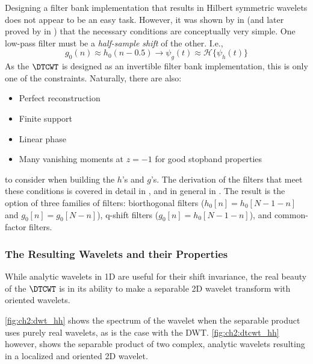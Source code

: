   Designing a filter bank implementation that results in Hilbert symmetric
  wavelets does not appear to be an easy task. However, it was shown
  by \citeauthor{kingsbury_image_1999} in \cite{kingsbury_image_1999} (and later proved by
  \citeauthor{selesnick_hilbert_2001} in \cite{selesnick_hilbert_2001}) that the
  necessary conditions are conceptually very simple. One low-pass filter must be
  a \emph{half-sample shift} of the other. I.e.,\ 
  \begin{equation}
    g_0(n) \approx h_0(n-0.5) \rightarrow \psi_g(t) \approx
    \mathcal{H}\{\psi_h(t)\}
  \end{equation}
  As the $\DTCWT$ is designed as an invertible filter bank implementation, this
  is only one of the constraints. Naturally, there are also:
  \begin{itemize}
    \item Perfect reconstruction
    \item Finite support
    \item Linear phase
    \item Many vanishing moments at $z=-1$ for good stopband properties
  \end{itemize}
  to consider when building the $h$'s and $g$'s.
  The derivation of the filters that meet these conditions is covered in
  detail in \cite{kingsbury_complex_2001, kingsbury_design_2003}, and in
  general in \cite{selesnick_dual-tree_2005}. The result is the
  option of three families of filters:  biorthogonal filters ($h_0[n] =
  h_0[N-1-n]$ and $g_0[n] = g_0[N-n]$), q-shift filters ($g_0[n]
  = h_0[N-1-n]$), and common-factor filters.

\subsubsection{The Resulting Wavelets and their Properties}
  While analytic wavelets in 1D are useful for their shift invariance, the real
  beauty of the $\DTCWT$ is in its ability to make a separable 2D wavelet
  transform with oriented wavelets. 
  
  \autoref{fig:ch2:dwt_hh} shows the spectrum of
  the wavelet when the separable product uses purely real wavelets, as is the
  case with the DWT\@. \autoref{fig:ch2:dtcwt_hh} however, shows the separable
  product of two complex, analytic wavelets resulting in a localized and
  oriented 2D wavelet.  
  
